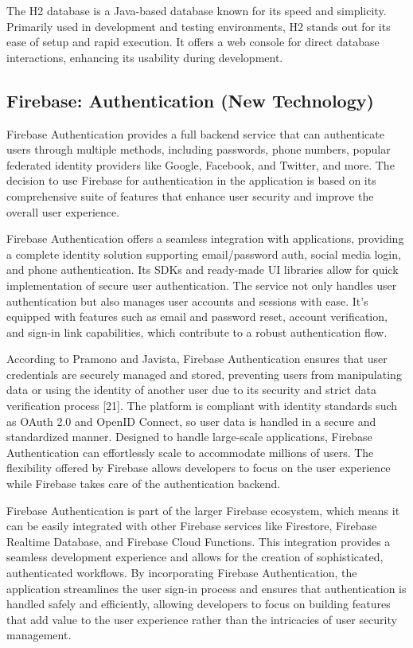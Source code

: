 The H2 database is a Java-based database known for its speed and simplicity. 
Primarily used in development and testing environments, H2 stands out for its ease of setup and rapid execution. 
It offers a web console for direct database interactions, enhancing its usability during development.




\subsection{Firebase: Authentication (New Technology)}

Firebase Authentication provides a full backend service that can authenticate users through multiple methods, including passwords, phone numbers, popular federated identity providers like Google, Facebook, and Twitter, and more. The decision to use Firebase for authentication in the application is based on its comprehensive suite of features that enhance user security and improve the overall user experience.

Firebase Authentication offers a seamless integration with applications, providing a complete identity solution supporting email/password auth, social media login, and phone authentication. Its SDKs and ready-made UI libraries allow for quick implementation of secure user authentication. The service not only handles user authentication but also manages user accounts and sessions with ease. It's equipped with features such as email and password reset, account verification, and sign-in link capabilities, which contribute to a robust authentication flow.

According to Pramono and Javista, Firebase Authentication ensures that user credentials are securely managed and stored, preventing users from manipulating data or using the identity of another user due to its security and strict data verification process [21]. The platform is compliant with identity standards such as OAuth 2.0 and OpenID Connect, so user data is handled in a secure and standardized manner. Designed to handle large-scale applications, Firebase Authentication can effortlessly scale to accommodate millions of users. The flexibility offered by Firebase allows developers to focus on the user experience while Firebase takes care of the authentication backend.

Firebase Authentication is part of the larger Firebase ecosystem, which means it can be easily integrated with other Firebase services like Firestore, Firebase Realtime Database, and Firebase Cloud Functions. This integration provides a seamless development experience and allows for the creation of sophisticated, authenticated workflows. By incorporating Firebase Authentication, the application streamlines the user sign-in process and ensures that authentication is handled safely and efficiently, allowing developers to focus on building features that add value to the user experience rather than the intricacies of user security management.
